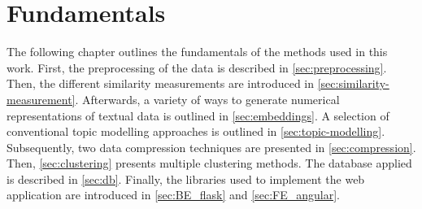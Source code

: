 \chapter{Fundamentals}\label{ch:methodology} %

The following chapter outlines the fundamentals of the methods used in this work.
First, the preprocessing of the data is described in \autoref{sec:preprocessing}.
Then, the different similarity measurements are introduced in \autoref{sec:similarity-measurement}.
Afterwards, a variety of ways to generate numerical representations of textual data is outlined in \autoref{sec:embeddings}.
A selection of conventional topic modelling approaches is outlined in \autoref{sec:topic-modelling}.
Subsequently, two data compression techniques are presented in \autoref{sec:compression}.
Then, \autoref{sec:clustering} presents multiple clustering methods.
The database applied is described in \autoref{sec:db}.
Finally, the libraries used to implement the web application are introduced in \autoref{sec:BE_flask} and \autoref{sec:FE_angular}.

























